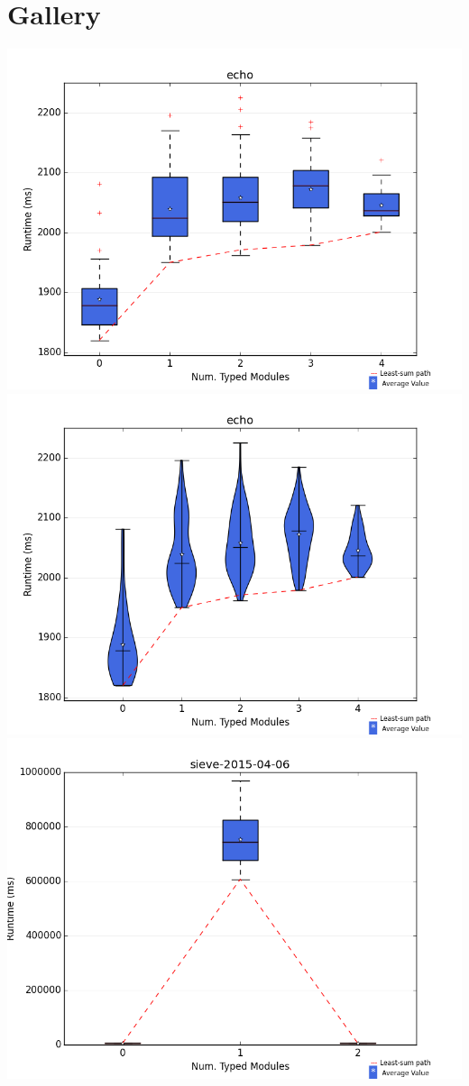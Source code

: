 \documentclass{article}
\begin{document}
\section{Gallery}
\includegraphics[width=\textwidth]{boxplots/echo-boxplot.png}
\includegraphics[width=\textwidth]{violins/echo-violin.png}
\newpage
\includegraphics[width=\textwidth]{boxplots/sieve-2015-04-06-boxplot.png}
\end{document}
